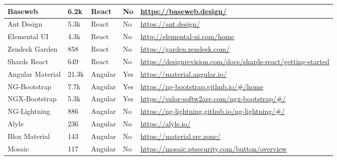 \begin{table*}[t]
\begin{tabularx}{\textwidth}{l|l|l|l|X}
		Baseweb                 & 6.2k                  & React                 & No                & \url{https://baseweb.design/}                                                    \\ \hline
		Ant Design              & 5.3k                  & React                 & No                & \url{https://ant.design/}                                                        \\ \hline
		Elemental UI            & 4.3k                  & React                 & No                & \url{http://elemental-ui.com/home }                                              \\ \hline
		Zendesk Garden          & 858                   & React                 & No                & \url{https://garden.zendesk.com/}                                                \\ \hline
		Shards React            & 649                   & React                 & No                & \url{https://designrevision.com/docs/shards-react/getting-started }              \\ \hline
		Angular Material        & 21.3k                 & Angular               & Yes               & \url{https://material.angular.io/}                                               \\ \hline
		NG-Bootstrap            & 7.7k                  & Angular               & Yes               & \url{https://ng-bootstrap.github.io/\#/home }                                    \\ \hline
		NGX-Bootstrap           & 5.3k                  & Angular               & Yes               & \url{https://valor-softw2are.com/ngx-bootstrap/\#/ }                             \\ \hline
		NG-Lightning            & 886                   & Angular               & No                & \url{https://ng-lightning.github.io/ng-lightning/\#/ }                           \\ \hline
		Alyle                   & 236                   & Angular               & No                & \url{https://alyle.io/}                                                          \\ \hline
		Blox Material           & 143                   & Angular               & No                & \url{https://material.src.zone/}                                                 \\ \hline
		Mosaic                  & 117                   & Angular               & No                & \url{https://mosaic.ptsecurity.com/button/overview }                             \\ \hline

\end{tabularx}
\end{table*}
